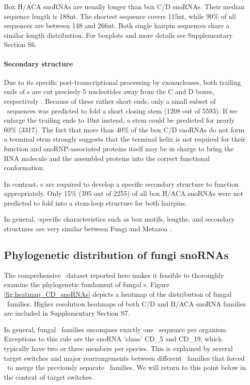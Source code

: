 Box H/ACA snoRNAs are usually longer than box C/D snoRNAs. Their median
sequence length is 188nt. The shortest sequence covers 115nt, while 90\% of
all sequences are between 148 and 266nt.  Both single hairpin sequences
share a similar length distribution. For boxplots and more details see
Supplementary Section S6.

\paragraph{\textbf{Secondary structure}} Due to its specific
post-transcriptional processing by exonucleases, both trailing ends of \cd
s are cut precisely 5 nucleotides away from the C and D boxes, respectively
\citep{Kishore:2013}. Because of these rather short ends, only a small
subset of \sno\ sequences was predicted to fold a short closing stem (1208
out of 5593).  If we enlarge the trailing ends to 10nt instead, a stem
could be predicted for nearly 60\% (3317). The fact that more than 40\% of
the box C/D snoRNAs do not form a terminal stem strongly suggests that the
terminal helix is not required for their function and snoRNP-associated
proteins itself may be in charge to bring the RNA molecule and the
assembled proteins into the correct functional conformation.

In contrast, \haca s are required to develop a 
specific secondary structure to function appropriately. Only 15\% (395
out of 2255) of all box H/ACA snoRNAs were not predicted to fold into
a stem-loop structure for both hairpins.

In general, \sno -specific characteristics such as box motifs,
lengths, and secondary structures are very similar between Fungi and
Metazoa \cite{Kehr:2014}.

\subsection{Phylogenetic distribution of fungi snoRNAs}

The comprehensive \sno\ dataset reported here makes it feasible to
thoroughly examine the phylogenetic fundament of fungal \sno s.  Figure
\ref{fig:heatmap_CD_snoRNAs} depicts a heatmap of the distribution of
fungal \cd\ families.  Higher resolution heatmaps of both C/D and H/ACA
snoRNA families are included in Supplementary Section S7.

In general, fungal \sno\ families encompass exactly one \sno\ sequence per
organism. Exceptions to this rule are the snoRNA 'clans' CD\_5 and
CD\_19, which typically have two or three members per species.  This is
explained by several target switches and major rearrangements between
different \sno\ families that forced \snostrip\ to merge the previously
separate \sno\ families. We will return to this point below in the context
of target switches.

